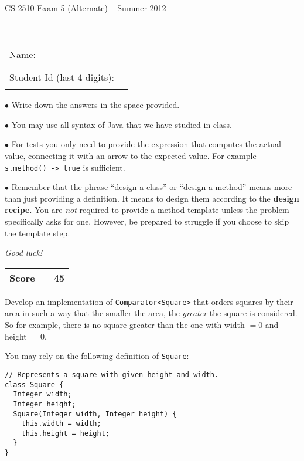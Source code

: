 \documentclass[11pt]{article}
\newcommand\code[1]{\texttt{#1}}
\def\pts#1{\marginpar{\footnotesize \raggedright  \fbox{#1 {\sc Points}}}}
\newcounter{Pctr}
\newenvironment{problem}{\stepcounter{Pctr}%
\begin{description}
\item[\noindent{\bf Problem} \arabic{Pctr}] 
\end{description}}{\relax}
\begin{document}
\renewcommand{\theenumi}{\Alph{enumi}}
\setcounter{Pctr}{0}


\vfill
\centerline{\Large CS 2510 Exam 5 (Alternate) -- Summer 2012}

~\\[2cm]

\begin{center}
\begin{tabular}{l@{\qquad}l}
Name:                        & \rule{200pt}{.1pt} \\[.5cm]
Student Id (last 4 digits):  & \rule{200pt}{.1pt} \\[.5cm]
\end{tabular}
\end{center}

\noindent\begin{minipage}{7.5cm} $\bullet$ Write down the answers in the
space provided. 

$\bullet$ You may use all syntax of Java that we have studied in
class.

$\bullet$ For tests you only need to provide the expression that
computes the actual value, connecting it with an arrow to the expected
value. For example \code{s.method() -> true} is sufficient.

$\bullet$ Remember that the phrase ``design a class'' or ``design a
method'' means more than just providing a definition. It means to
design them according to the \textbf{design recipe}.  You are
\textit{not} required to provide a method template unless the problem
specifically asks for one.  However, be prepared to struggle if you
choose to skip the template step.

\bigskip

\textit{Good luck!}
\end{minipage}\hfil\begin{minipage}[t]{4.5cm}
\begin{tabular}{|c|l@{\qquad\qquad}|r|}
\hline
\textbf{Score} &  & 45 \\ \hline
\end{tabular}
\end{minipage}

\vfill\thispagestyle{empty}
\newpage

\pts{45}
\begin{problem}
Develop an implementation of {\tt Comparator<Square>} that orders
squares by their area in such a way that the smaller the area, the
\emph{greater} the square is considered.  So for example, there is no
square greater than the one with width $= 0$ and height $= 0$.

You may rely on the following definition of {\tt Square}:

\begin{verbatim}
// Represents a square with given height and width.
class Square {
  Integer width;
  Integer height;
  Square(Integer width, Integer height) {
    this.width = width;
    this.height = height;
  }
}
\end{verbatim}
\end{problem}
\end{document}
